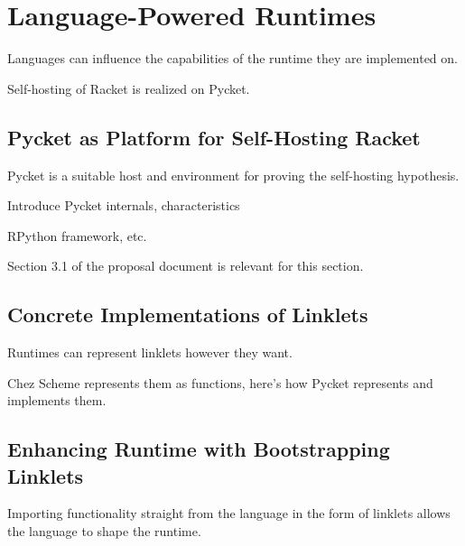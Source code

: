 \chapter{Language-Powered Runtimes}
	\label{chapter:pycket}

	\begin{chapterpoint}
		Languages can influence the capabilities of the runtime they are implemented on.

		Self-hosting of Racket is realized on Pycket.

	\end{chapterpoint}

	\section{Pycket as Platform for Self-Hosting Racket}

		\label{section:language-powered-runtimes:pycket-as-platform}

		\begin{mainpoint}
			Pycket is a suitable host and environment for proving the self-hosting hypothesis.
		\end{mainpoint}

		\begin{todo}[TODO]
			Introduce Pycket internals, characteristics

			RPython framework, etc.
		\end{todo}

		\begin{todo}[Import]
				Section 3.1 of the proposal document is relevant for this section.
		\end{todo}

	\section{Concrete Implementations of Linklets}

		\begin{mainpoint}
			Runtimes can represent linklets however they want.

			Chez Scheme represents them as functions, here's how Pycket represents and implements them.
		\end{mainpoint}

	\section{Enhancing Runtime with Bootstrapping Linklets}
		\begin{mainpoint}
			Importing functionality straight from the language in the form of linklets allows the language to shape the runtime.
		\end{mainpoint}
